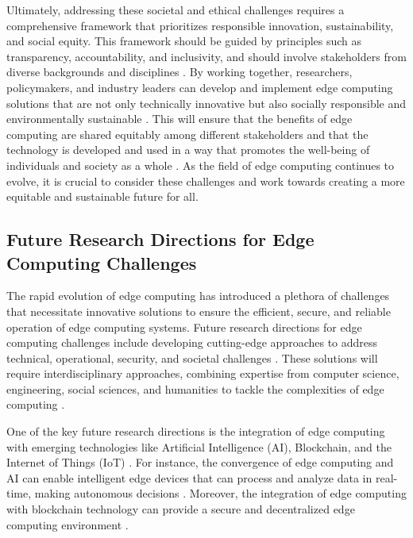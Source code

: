 \documentclass[11pt,a4paper]{article}
\begin{document}
Ultimately, addressing these societal and ethical challenges requires a comprehensive framework that prioritizes responsible innovation, sustainability, and social equity. This framework should be guided by principles such as transparency, accountability, and inclusivity, and should involve stakeholders from diverse backgrounds and disciplines \cite{arxiv:2211.05851}. By working together, researchers, policymakers, and industry leaders can develop and implement edge computing solutions that are not only technically innovative but also socially responsible and environmentally sustainable \cite{arxiv:1906.00711}. This will ensure that the benefits of edge computing are shared equitably among different stakeholders and that the technology is developed and used in a way that promotes the well-being of individuals and society as a whole \cite{arxiv:1906.11056}. As the field of edge computing continues to evolve, it is crucial to consider these challenges and work towards creating a more equitable and sustainable future for all.


\subsection{Future Research Directions for Edge Computing Challenges}


The rapid evolution of edge computing has introduced a plethora of challenges that necessitate innovative solutions to ensure the efficient, secure, and reliable operation of edge computing systems. Future research directions for edge computing challenges include developing cutting-edge approaches to address technical, operational, security, and societal challenges \cite{arxiv:2004.07311}. These solutions will require interdisciplinary approaches, combining expertise from computer science, engineering, social sciences, and humanities to tackle the complexities of edge computing \cite{arxiv:1702.06331}. 

One of the key future research directions is the integration of edge computing with emerging technologies like Artificial Intelligence (AI), Blockchain, and the Internet of Things (IoT) \cite{arxiv:1808.05283}. For instance, the convergence of edge computing and AI can enable intelligent edge devices that can process and analyze data in real-time, making autonomous decisions \cite{arxiv:2003.12172}. Moreover, the integration of edge computing with blockchain technology can provide a secure and decentralized edge computing environment \cite{arxiv:2111.00416}. 
\end{document}
